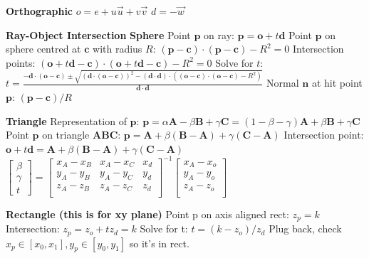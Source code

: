 \documentclass[letterpaper, 8pt]{extarticle}
\begin{document}
\begin{multicols*}{4}
    \textbf{Orthographic}
    $o = e + u \vec{u} + v \vec{v}$
    $d = -\vec{w}$


    \textbf{Ray-Object Intersection}
    \textbf{Sphere}
    Point $\mathbf{p}$ on ray: $\mathbf{p} = \mathbf{o} + t\mathbf{d}$
    Point $\mathbf{p}$ on sphere centred at $\mathbf{c}$ with radius $R$: $(\mathbf{p} - \mathbf{c}) \cdot (\mathbf{p} - \mathbf{c}) - R^2 = 0$
    Intersection points: $(\mathbf{o} + t\mathbf{d} - \mathbf{c}) \cdot (\mathbf{o} + t\mathbf{d} - \mathbf{c}) - R^2 = 0$
    Solve for $t$:
    $t = \frac{-\mathbf{d} \cdot (\mathbf{o} - \mathbf{c}) \pm \sqrt{(\mathbf{d} \cdot (\mathbf{o} - \mathbf{c}))^2 - (\mathbf{d} \cdot \mathbf{d}) \cdot ((\mathbf{o} - \mathbf{c}) \cdot (\mathbf{o} - \mathbf{c}) - R^2)}}{\mathbf{d} \cdot \mathbf{d}}$
    Normal $\mathbf{n}$ at hit point $\mathbf{p}$:
    $(\mathbf{p} - \mathbf{c}) / R$

    \textbf{Triangle}
    Representation of $\mathbf{p}$:
    $\mathbf{p} = \alpha \mathbf{A} - \beta \mathbf{B} + \gamma \mathbf{C} = (1 - \beta - \gamma) \mathbf{A} + \beta \mathbf{B} + \gamma \mathbf{C}$
    Point $\mathbf{p}$ on triangle $\mathbf{ABC}$:
    $\mathbf{p}=\mathbf{A} + \beta (\mathbf{B} - \mathbf{A}) + \gamma(\mathbf{C} - \mathbf{A})$
    Intersection point:
    $\mathbf{o} + t \mathbf{d} = \mathbf{A} + \beta(\mathbf{B} - \mathbf{A}) + \gamma(\mathbf{C} - \mathbf{A})$
    $
        \begin{bmatrix}
            \beta \\ \gamma \\ t
        \end{bmatrix}
        =
        \begin{bmatrix}
            x_A - x_B & x_A - x_C & x_d \\
            y_A - y_B & y_A - y_C & y_d \\
            z_A - z_B & z_A - z_C & z_d \\
        \end{bmatrix}^{-1}
        \begin{bmatrix}
            x_A - x_o \\
            y_A - y_o \\
            z_A - z_o \\
        \end{bmatrix}
    $

    \textbf{Rectangle (this is for xy plane)}
    Point p on axis aligned rect: $z_p = k$
    Intersection: $z_p = z_o + t z_d = k$
    Solve for t: $t = (k - z_o) / z_d$
    Plug back, check $x_p \in [x_0, x_1], y_p \in [y_0, y_1]$ so it's in rect.


\end{multicols*}
\end{document}
